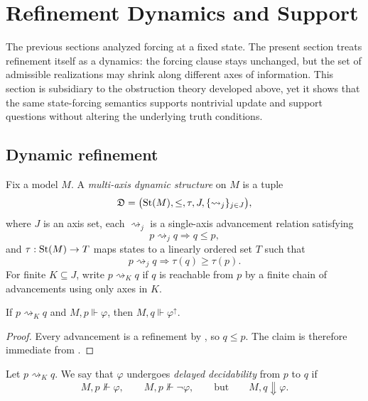 \section{Refinement Dynamics and Support}\label{sec:multiaxis-refinement}

The previous sections analyzed forcing at a fixed state. The present section treats refinement itself as a dynamics: the forcing clause stays unchanged, but the set of admissible realizations may shrink along different axes of information. This section is subsidiary to the obstruction theory developed above, yet it shows that the same state-forcing semantics supports nontrivial update and support questions without altering the underlying truth conditions.

\subsection{Dynamic refinement}

\begin{definition}\label{def:multi-axis-dynamic-structure}
Fix a model $M$. A \emph{multi-axis dynamic structure} on $M$ is a tuple
\[
\mathfrak{D}=\bigl(\mathrm{St}(M),\le,\tau,J,\{\rightsquigarrow_j\}_{j\in J}\bigr),
\]
where $J$ is an axis set, each $\rightsquigarrow_j$ is a single-axis advancement relation satisfying
\[
p\rightsquigarrow_j q \Longrightarrow q\le p,
\]
and $\tau:\mathrm{St}(M)\to T$ maps states to a linearly ordered set $T$ such that
\[
p\rightsquigarrow_j q \Longrightarrow \tau(q)\ge \tau(p).
\]
For finite $K\subseteq J$, write $p\rightsquigarrow_K q$ if $q$ is reachable from $p$ by a finite chain of advancements using only axes in $K$.
\end{definition}

\begin{proposition}\label{prop:updates-preserve-forcing}
If $p\rightsquigarrow_K q$ and $M,p\Vdash\varphi$, then $M,q\Vdash\varphi^\uparrow$.
\end{proposition}

\begin{proof}
Every advancement is a refinement by , so $q\le p$. The claim is therefore immediate from .
\end{proof}

\begin{definition}\label{def:delayed-decidability}
Let $p\rightsquigarrow_K q$. We say that $\varphi$ undergoes \emph{delayed decidability} from $p$ to $q$ if
\[
M,p\nVdash\varphi,\qquad
M,p\nVdash\neg\varphi,\qquad
\text{but}\qquad
M,q\Downarrow\varphi.
\]
\end{definition}

